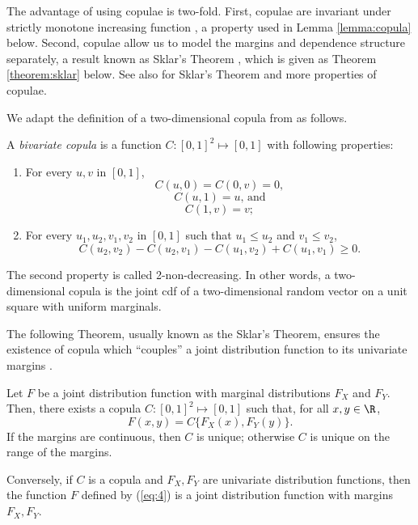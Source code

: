 \documentclass[11pt,a4paper,english]{article}
\providecommand{\natp}[1]{\textcolor{darkorange}{#1}}
\begin{document}
The advantage of using copulae is two-fold.
First, copulae are invariant under strictly
monotone increasing function \citep{schweizer1981nonparametric}, a
property used in Lemma \ref{lemma:copula} below. 
Second, copulae allow us to model the margins and dependence structure 
separately, a result known as Sklar's Theorem \citep{Sklar1959}, which
is given as Theorem \ref{theorem:sklar} below. 
See also \citep{Nelsen1999, joe1997multivariate, McNeil2005} for
Sklar's Theorem and more properties of copulae.

We adapt the definition of a two-dimensional copula from
\citep{Nelsen1999} as follows.

\begin{defi} 
  A {\em bivariate copula} is a function $C: [0,1]^2 \mapsto [0,1]$ with following properties:
  \begin{enumerate}
    \item For every $u,v$ in $[0,1]$,
      \[C(u,0)= C(0,v)=0, \]
    \[C(u,1)= u \text{, and}\]
    \[C(1,v)= v;\]
    \item For every $u_1,u_2, v_1, v_2$ in $[0,1]$ such that $u_1 \leq u_2$ and $v_1 \leq v_2$,
    \[C(u_2,v_2)-C(u_2,v_1)-C(u_1, v_2)+C(u_1,v_1) \geq 0.\]
  \end{enumerate}
  \end{defi}

The second property is called 2-non-decreasing.
In other words, a two-dimensional copula is the joint cdf of a two-dimensional random vector
on a unit square with uniform marginals.

The following Theorem, usually known as the Sklar's
Theorem, ensures the existence of copula which “couples” a 
joint distribution function to its univariate margins \citep[Theorem 2.3.3.]{Nelsen1999}.


\begin{theorem}
  \label{theorem:sklar}
  Let $F$ be a joint distribution function with marginal distributions
  $F_X$ and $F_Y$. Then, there exists a copula $C:[0,1]^2 \mapsto
  [0,1]$ such that, for all $x,y\in \R$,
  \begin{equation}
    \label{eq:4}
    F(x,y)=C\{F_X(x), F_Y(y)\}.
  \end{equation}
  If the margins are continuous, then $C$ is unique; otherwise $C$ is
  unique on the range of the margins.

  Conversely, if $C$ is a copula and $F_X, F_Y$ are univariate
  distribution functions, then the function $F$ defined by (\ref{eq:4})
  is a joint distribution function with margins $F_X, F_Y$.
\end{theorem}
\end{document}
